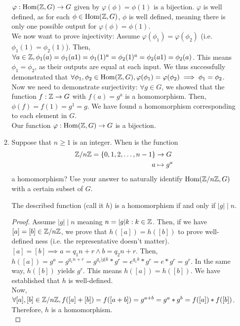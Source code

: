 \documentclass{amsart}
\begin{document}
\begin{enumerate}[itemsep=0.4in]
\begin{enumerate}
        $\varphi:\operatorname{Hom}(\mathbb{Z},G)\to G$ given by $\varphi(\phi)=\phi(1)$ is a bijection. $\varphi$ is well defined, as for each $\phi\in\operatorname{Hom}(\mathbb{Z},G)$, $\phi$ is well defined, meaning there is only one possible output for $\varphi(\phi)=\phi(1)$.\\

        We now want to prove injectivity: Assume $\varphi(\phi_1)=\varphi(\phi_2)$ (i.e. $\phi_1(1)=\phi_2(1)$). Then, $\forall a\in\mathbb{Z},\phi_1(a)=\phi_1(a1)=\phi_1(1)^a=\phi_2(1)^a=\phi_2(a1)=\phi_2(a)$. This means $\phi_1=\phi_2$, as their outputs are equal at each input. We thus successfully demonstrated that $\forall \phi_1,\phi_2\in\operatorname{Hom}(\mathbb{Z},G),\varphi(\phi_1)=\varphi(\phi_2)\implies\phi_1=\phi_2$.\\

        Now we need to demonstrate surjectivity: $\forall g\in G$, we showed that the function $f:\mathbb{Z}\to G$ with $f(a)=g^a$ is a homomorphism. Then, $\phi(f)=f(1)=g^1=g$. We have found a homomorphism corresponding to each element in $G$.\\

        Our function $\varphi:\operatorname{Hom}(\mathbb{Z},G)\to G$ is a bijection.
    
	\item Suppose that $n\geq 1$ is an integer. When is the function
	\begin{align*}
	\mathbb{Z}/n\mathbb{Z} = \{0,1,2,\ldots,n-1\}&\to G\\
	a&\mapsto g^a
	\end{align*}
	a homomorphism? Use your answer to naturally identify $\operatorname{Hom}(\mathbb{Z}/n\mathbb{Z},G)$ with a certain subset of $G$.\\

        \begin{lemma}
            The described function (call it $h$) is a homomorphism if and only if $|g|\mid n$. 
        \end{lemma}

        \begin{proof}
            Assume $|g|\mid n$ meaning $n=|g|k:k\in\mathbb{Z}$. Then, if we have $[a]=[b]\in\mathbb{Z}/n\mathbb{Z}$, we prove that $h([a])=h([b])$ to prove well-defined ness (i.e. the representative doesn't matter). $[a]=[b]\implies a=q_1n+r\land b=q_2n+r$. Then, $h([a])=g^a=g^{q_1n+r}=g^{q_1|g|k}*g^r=e^{q_1k}*g^r=e*g^r=g^r$. In the same way, $h([b])$ yields $g^r$. This means $h([a])=h([b])$. We have established that $h$ is well-defined.\\

            Now, $\forall [a],[b]\in\mathbb{Z}/n\mathbb{Z},f([a]+[b])=f([a+b])=g^{a+b}=g^a*g^b=f([a])*f([b])$. Therefore, $h$ is a homomorphism.\\


\end{proof}
\end{enumerate}
\end{enumerate}
\end{document}
